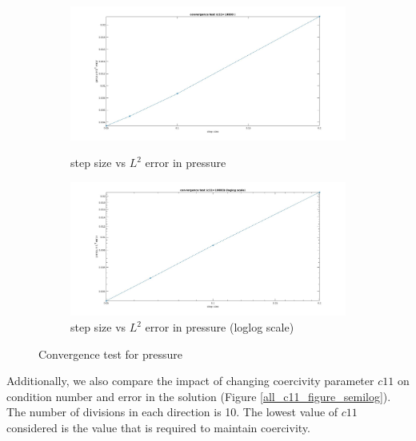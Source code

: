 \documentclass[a4paper,oneside,openright,spanish,english]{book}
\begin{document}
\begin{figure}
\begin{subfigure}{\textwidth}	
  \includegraphics[width=\linewidth]{step_size_vs_pressure_l2_error.jpg}
  \caption{step size vs $L^2$ error in pressure} 
  \label{step_size_vs_pressure_l2_error}
  \includegraphics[width=\linewidth]{step_size_vs_pressure_l2_error_loglog.jpg}
  \caption{step size vs $L^2$ error in pressure (loglog scale)} 
  \label{step_size_vs_pressure_l2_error_loglog}
\end{subfigure}
\caption{Convergence test for pressure}
\label{convergence_check_pressure}
\end{figure}

Additionally, we also compare the impact of changing coercivity parameter $c11$ on condition number and error in the solution (Figure \ref{all_c11_figure_semilog}). The number of divisions in each direction is 10. The lowest value of $c11$ considered is the value that is required to maintain coercivity.
\end{document}
